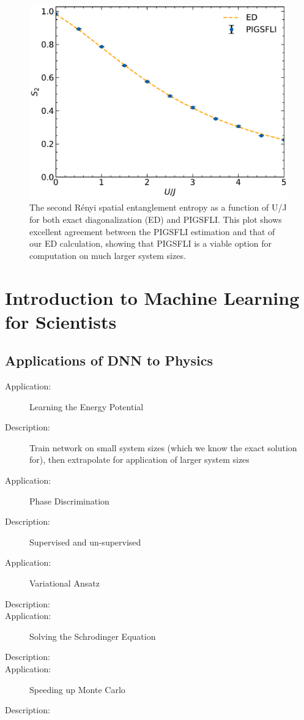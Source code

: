 \begin{figure}[H]
\centering
\includegraphics[scale=0.5]{../figures/renyi_spatial.pdf}
\caption{The second Rényi spatial entanglement entropy as a function of U/J for both exact diagonalization (ED) and PIGSFLI. This plot shows excellent agreement between the PIGSFLI estimation and that of our ED calculation, showing that PIGSFLI is a viable option for computation on much larger system sizes.}
\label{fig:renyi_spatial}
\end{figure}

\section{Introduction to Machine Learning for Scientists}

\subsection{Applications of DNN to Physics}

\begin{description}
\item [Application:] Learning the Energy Potential
\item [Description:] Train network on small system sizes (which we know the exact solution for), then extrapolate for application of larger system sizes 

\item [Application:] Phase Discrimination
\item [Description:] Supervised and un-supervised 

\item[Application:] Variational Ansatz 
\item[Description:] 

\item [Application:] Solving the Schrodinger Equation
\item[Description:] 

\item [Application:] Speeding up Monte Carlo
\item [Description:] 
\end{description}

